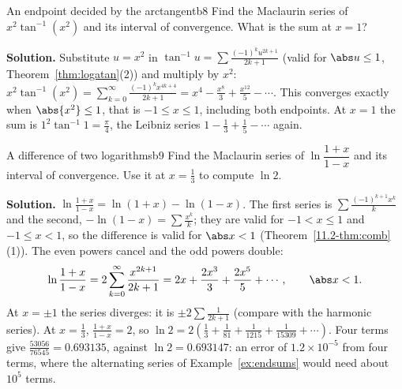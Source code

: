 \documentclass[11pt]{article}
\begin{document}
\begin{exmp}{An endpoint decided by the arctangent}{b8}
Find the Maclaurin series of $x^2\tan^{-1}(x^2)$ and its interval of convergence. What is the sum at $x=1$?

\textbf{Solution.} Substitute $u=x^2$ in $\tan^{-1}u=\sum\frac{(-1)^ku^{2k+1}}{2k+1}$ (valid for $\abs u\le1$, Theorem~\ref{thm:logatan}(2)) and multiply by $x^2$: $x^2\tan^{-1}(x^2)=\sum_{k=0}^\infty\frac{(-1)^kx^{4k+4}}{2k+1}=x^4-\frac{x^8}3+\frac{x^{12}}5-\cdots$. This converges exactly when $\abs{x^2}\le1$, that is $-1\le x\le1$, including both endpoints. At $x=1$ the sum is $1^2\tan^{-1}1=\frac\pi4$, the Leibniz series $1-\frac13+\frac15-\cdots$ again.
\end{exmp}

\begin{exmp}{A difference of two logarithms}{b9}
Find the Maclaurin series of $\ln\dfrac{1+x}{1-x}$ and its interval of convergence. Use it at $x=\frac13$ to compute $\ln2$.

\textbf{Solution.} $\ln\frac{1+x}{1-x}=\ln(1+x)-\ln(1-x)$. The first series is $\sum\frac{(-1)^{k+1}x^k}k$ and the second, $-\ln(1-x)=\sum\frac{x^k}k$; they are valid for $-1<x\le1$ and $-1\le x<1$, so the difference is valid for $\abs x<1$ (Theorem~\ref{11.2-thm:comb}(1)). The even powers cancel and the odd powers double:
\[
\ln\frac{1+x}{1-x}=2\sum_{k=0}^\infty\frac{x^{2k+1}}{2k+1}=2x+\frac{2x^3}3+\frac{2x^5}5+\cdots,\qquad\abs x<1 .
\]
At $x=\pm1$ the series diverges: it is $\pm2\sum\frac1{2k+1}$ (compare with the harmonic series). At $x=\frac13$, $\frac{1+x}{1-x}=2$, so $\ln2=2\left(\frac13+\frac1{81}+\frac1{1215}+\frac1{15309}+\cdots\right)$. Four terms give $\frac{53056}{76545}=0.693135$, against $\ln2=0.693147$: an error of $1.2\times10^{-5}$ from four terms, where the alternating series of Example~\ref{ex:endsums} would need about $10^5$ terms.
\end{exmp}
\end{document}
